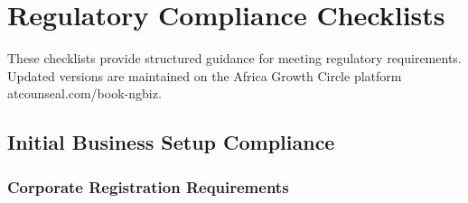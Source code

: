 
\chapter{Regulatory Compliance Checklists}\label{ch:regulatory-compliance}

\begin{importantbox}
    These checklists provide structured guidance for meeting regulatory requirements. Updated versions are maintained on the Africa Growth Circle platform atcounseal.com/book-ngbiz.
\end{importantbox}

\vspace{2em}


\section{Initial Business Setup Compliance}\label{sec:initial-compliance}
\vspace{1em}

\subsection{Corporate Registration Requirements}\label{subsec:corporate-registration}
\vspace{1em}

